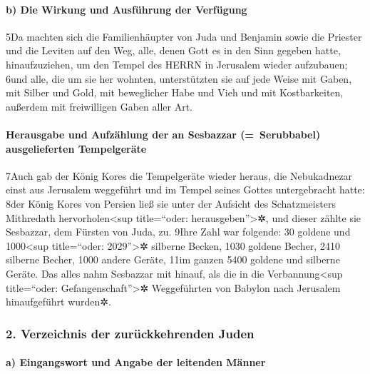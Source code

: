 \hypertarget{b-die-wirkung-und-ausfuxfchrung-der-verfuxfcgung}{%
\paragraph{b) Die Wirkung und Ausführung der
Verfügung}\label{b-die-wirkung-und-ausfuxfchrung-der-verfuxfcgung}}

5Da machten sich die Familienhäupter von Juda und Benjamin sowie die
Priester und die Leviten auf den Weg, alle, denen Gott es in den Sinn
gegeben hatte, hinaufzuziehen, um den Tempel des HERRN in Jerusalem
wieder aufzubauen; 6und alle, die um sie her wohnten, unterstützten sie
auf jede Weise mit Gaben, mit Silber und Gold, mit beweglicher Habe und
Vieh und mit Kostbarkeiten, außerdem mit freiwilligen Gaben aller Art.

\hypertarget{herausgabe-und-aufzuxe4hlung-der-an-sesbazzar-serubbabel-ausgelieferten-tempelgeruxe4te}{%
\paragraph{Herausgabe und Aufzählung der an Sesbazzar (=~Serubbabel)
ausgelieferten
Tempelgeräte}\label{herausgabe-und-aufzuxe4hlung-der-an-sesbazzar-serubbabel-ausgelieferten-tempelgeruxe4te}}

7Auch gab der König Kores die Tempelgeräte wieder heraus, die
Nebukadnezar einst aus Jerusalem weggeführt und im Tempel seines Gottes
untergebracht hatte: 8der König Kores von Persien ließ sie unter der
Aufsicht des Schatzmeisters Mithredath hervorholen\textless sup
title=``oder: herausgeben''\textgreater✲, und dieser zählte sie
Sesbazzar, dem Fürsten von Juda, zu. 9Ihre Zahl war folgende: 30 goldene
und 1000\textless sup title=``oder: 2029''\textgreater✲ silberne Becken,
1030 goldene Becher, 2410 silberne Becher, 1000 andere Geräte, 11im
ganzen 5400 goldene und silberne Geräte. Das alles nahm Sesbazzar mit
hinauf, als die in die Verbannung\textless sup title=``oder:
Gefangenschaft''\textgreater✲ Weggeführten von Babylon nach Jerusalem
hinaufgeführt wurden✲.

\hypertarget{verzeichnis-der-zuruxfcckkehrenden-juden}{%
\subsubsection{2. Verzeichnis der zurückkehrenden
Juden}\label{verzeichnis-der-zuruxfcckkehrenden-juden}}

\hypertarget{a-eingangswort-und-angabe-der-leitenden-muxe4nner}{%
\paragraph{a) Eingangswort und Angabe der leitenden
Männer}\label{a-eingangswort-und-angabe-der-leitenden-muxe4nner}}

